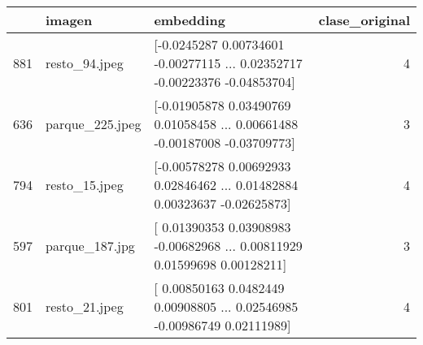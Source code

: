 \begin{tabular}{lllr}
\toprule
 & imagen & embedding & clase\_original \\
\midrule
881 & resto\_94.jpeg & [-0.0245287   0.00734601 -0.00277115 ...  0.02352717 -0.00223376
 -0.04853704] & 4 \\
636 & parque\_225.jpeg & [-0.01905878  0.03490769  0.01058458 ...  0.00661488 -0.00187008
 -0.03709773] & 3 \\
794 & resto\_15.jpeg & [-0.00578278  0.00692933  0.02846462 ...  0.01482884  0.00323637
 -0.02625873] & 4 \\
597 & parque\_187.jpg & [ 0.01390353  0.03908983 -0.00682968 ...  0.00811929  0.01599698
  0.00128211] & 3 \\
801 & resto\_21.jpeg & [ 0.00850163  0.0482449   0.00908805 ...  0.02546985 -0.00986749
  0.02111989] & 4 \\
\bottomrule
\end{tabular}
